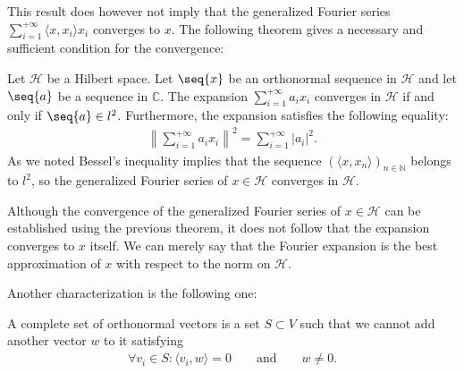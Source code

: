     This result does however not imply that the generalized Fourier series $\sum_{i=1}^{+\infty}\langle x, x_i\rangle x_i$ converges to $x$. The following theorem gives a necessary and sufficient condition for the convergence:
    \begin{theorem}
        Let $\mathcal{H}$ be a Hilbert space. Let $\seq{x}$ be an orthonormal sequence in $\mathcal{H}$ and let $\seq{a}$ be a sequence in $\mathbb{C}$. The expansion $\sum_{i=1}^{+\infty}a_ix_i$ converges in $\mathcal{H}$ if and only if $\seq{a}\in l^2$. Furthermore, the expansion satisfies the following equality:
        \begin{gather}
            \left\lVert\sum_{i=1}^{+\infty}a_ix_i\right\rVert^2 = \sum_{i=1}^{+\infty}|a_i|^2.
        \end{gather}
        As we noted Bessel's inequality implies that the sequence $(\langle x, x_n\rangle)_{n\in\mathbb{N}}$ belongs to $l^2$, so the generalized Fourier series of $x\in\mathcal{H}$ converges in $\mathcal{H}$.
    \end{theorem}
    \begin{remark}
        Although the convergence of the generalized Fourier series of $x\in\mathcal{H}$ can be established using the previous theorem, it does not follow that the expansion converges to $x$ itself. We can merely say that the Fourier expansion is the best approximation of $x$ with respect to the norm on $\mathcal{H}$.
    \end{remark}

    Another characterization is the following one:
    \begin{adefinition}
        A complete set of orthonormal vectors is a set $S\subset V$ such that we cannot add another vector $w$ to it satisfying
        \begin{gather}
            \forall v_i\in S: \langle v_i, w\rangle = 0\qquad\text{and}\qquad  w\neq0.
        \end{gather}
    \end{adefinition}


